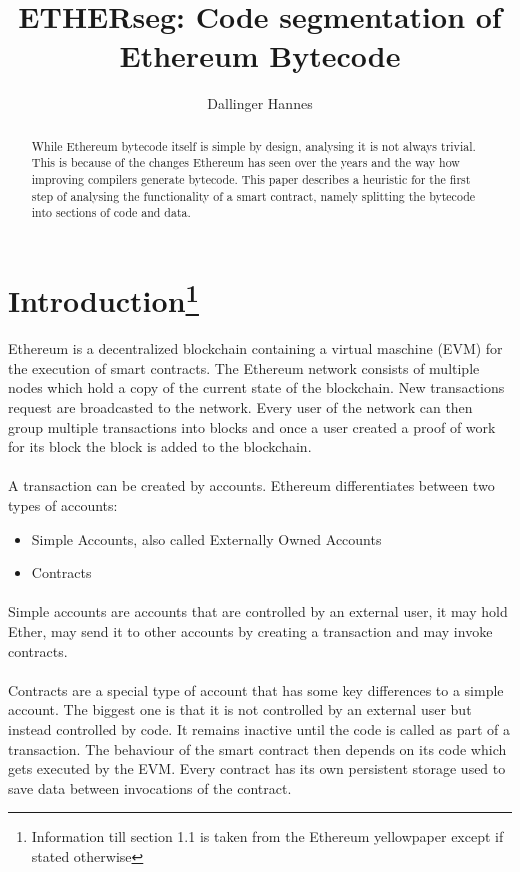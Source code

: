 \documentclass{article}
\title{ETHERseg: Code segmentation of Ethereum Bytecode}
\author{Dallinger Hannes}
\begin{document}
\maketitle

\begin{abstract}
    While Ethereum bytecode itself is simple by design, analysing it is not always trivial. This is because of the changes Ethereum has seen over the years and the way how improving compilers generate bytecode. This paper describes a heuristic for the first step of analysing the functionality of a smart contract, namely splitting the bytecode into sections of code and data.
\end{abstract}


\section[Introduction]{Introduction\footnote{Information till section 1.1 is taken from the Ethereum yellowpaper\cite{yellow_paper} except if stated otherwise}}
    Ethereum is a decentralized blockchain containing a virtual maschine (EVM) for the execution of smart contracts. The Ethereum network consists of multiple nodes which hold a copy of the current state of the blockchain. New transactions request are broadcasted to the network. Every user of the network can then group multiple transactions into blocks and once a user created a proof of work for its block the block is added to the blockchain.
\paragraph{}
    A transaction can be created by accounts. Ethereum differentiates between two types of accounts:
    \begin{itemize}
        \item Simple Accounts, also called Externally Owned Accounts
        \item Contracts
    \end{itemize}
\paragraph{}    
    Simple accounts are accounts that are controlled by an external user, it may hold Ether, may send it to other accounts by creating a transaction and may invoke contracts.
\paragraph{}
    Contracts are a special type of account that has some key differences to a simple account. The biggest one is that it is not controlled by an external user but instead controlled by code. It remains inactive until the code is called as part of a transaction. The behaviour of the smart contract then depends on its code which gets executed by the EVM. Every contract has its own persistent storage used to save data between invocations of the contract.
\end{document}
